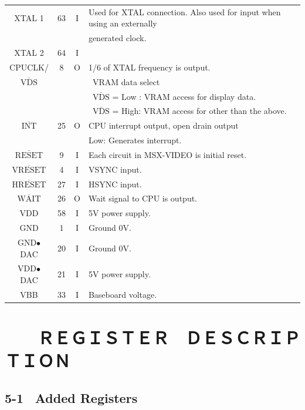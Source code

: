 \documentclass[a4paper,10pt]{article}
\begin{document}
\begin{tabular}{|c|c|c|l|}
XTAL 1 & 63 & I & Used for XTAL connection. Also used for input when using an externally\\[-1.04em]
& & & generated clock.\\[-1.04em]
XTAL 2 & 64 & I &\\[-1.04em]
CPUCLK/ & 8 & O & 1/6 of XTAL frequency is output.\\[-1.04em]
$\overline{\mbox{VDS}}$ & & & \ VRAM data select\\[-1.04em]
& & & \ $\overline{\mbox{VDS}}$ = Low : VRAM access for display data.\\[-1.04em]
& & & \ $\overline{\mbox{VDS}}$ = High: VRAM access for other than the above.\\[-1.04em]
$\overline{\mbox{INT}}$ & 25 & O & CPU interrupt output, open drain output\\[-1.04em]
& & & Low: Generates interrupt.\\[-1.04em]
$\overline{\mbox{RESET}}$ & 9 & I & Each circuit in MSX-VIDEO is initial reset.\\[-1.04em]
$\overline{\mbox{VRESET}}$ & 4 & I & VSYNC input.\\[-1.04em]
$\overline{\mbox{HRESET}}$ & 27 & I & HSYNC input.\\[-1.04em]
$\overline{\mbox{WAIT}}$ & 26 & O & Wait signal to CPU is output.\\[-1.04em]
V\scriptsize{DD} & 58 & I & 5V power supply.\\[-1.04em]
GND & 1 & I & Ground 0V.\\[-1.04em]
GND$\bullet$DAC & 20 & I & Ground 0V.\\[-1.04em]
V\scriptsize{DD}\normalsize{$\bullet$DAC} & 21 & I & 5V power supply.\\[-1.04em]
V\scriptsize{BB} & 33 & I & Baseboard voltage.\\
\hline
\end{tabular}

\newpage

\fontsize{11.2pt}{11.2pt}\selectfont

\section*{　　ＲＥＧＩＳＴＥＲ　ＤＥＳＣＲＩＰＴＩＯＮ}

\subsection*{5-1 \, Added Registers}
\end{document}
